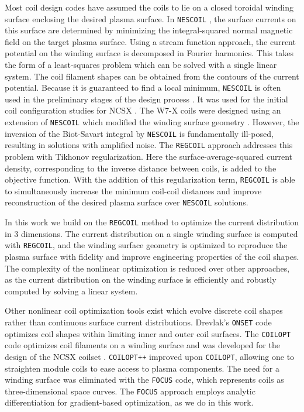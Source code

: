 \documentclass[aps,unsortedaddress]{revtex4-1}
\begin{document}
Most coil design codes have assumed the coils to lie on a closed toroidal winding surface enclosing the desired plasma surface. In \texttt{NESCOIL} \cite{Merkel1987}, the surface currents on this surface are determined by minimizing the integral-squared normal magnetic field on the target plasma surface. Using a stream function approach, the current potential on the winding surface is decomposed in Fourier harmonics. This takes the form of a least-squares problem which can be solved with a single linear system. The coil filament shapes can be obtained from the contours of the current potential. Because it is guaranteed to find a local minimum, \texttt{NESCOIL} is often used in the preliminary stages of the design process \cite{Spong2010, Ku2011, Drevlak2013}. It was used for the initial coil configuration studies for NCSX \cite{Pomphrey2001}. The W7-X coils were designed using an extension of \texttt{NESCOIL} which modified the winding surface geometry \cite{Beidler1999}. However, the inversion of the Biot-Savart integral by \texttt{NESCOIL} is fundamentally ill-posed, resulting in solutions with amplified noise. The \texttt{REGCOIL} \cite{Landreman2017} approach addresses this problem with Tikhonov regularization. Here the surface-average-squared current density, corresponding to the inverse distance between coils, is added to the objective function. With the addition of this regularization term, \texttt{REGCOIL} is able to simultaneously increase the minimum coil-coil distances and improve reconstruction of the desired plasma surface over \texttt{NESCOIL} solutions. 

In this work we build on the \texttt{REGCOIL} method to optimize the current distribution in 3 dimensions. The current distribution on a single winding surface is computed with \texttt{REGCOIL}, and the winding surface geometry is optimized to reproduce the plasma surface with fidelity and improve engineering properties of the coil shapes. The complexity of the nonlinear optimization is reduced over other approaches, as the current distribution on the winding surface is efficiently and robustly computed by solving a linear system.  

Other nonlinear coil optimization tools exist which evolve discrete coil shapes rather than continuous surface current distributions. Drevlak's \texttt{ONSET} code \cite{Drevlak1998} optimizes coil shapes within limiting inner and outer coil surfaces. The \texttt{COILOPT} \cite{Strickler2002,Strickler2004} code optimizes coil filaments on a winding surface and was developed for the design of the NCSX coilset \cite{Zarnstorff2001}. \texttt{COILOPT++} \cite{Brown2015} improved upon \texttt{COILOPT}, allowing one to straighten module coils to ease access to plasma components. The need for a winding surface was eliminated with the \texttt{FOCUS} \cite{Zhu2017} code, which represents coils as three-dimensional space curves. The \texttt{FOCUS} approach employs analytic differentiation for gradient-based optimization, as we do in this work. 
\end{document}
